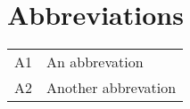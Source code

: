 \section*{Abbreviations}
\begin{longtable}[l]{ll}
    A1  & An abbrevation \\ 
    A2  & Another abbrevation 
\end{longtable}
